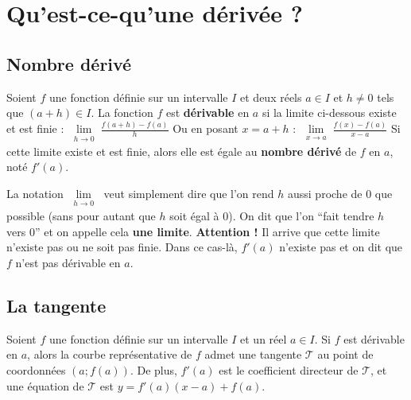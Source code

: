 



	\section{Qu'est-ce-qu'une dérivée ?}
	
	\subsection{Nombre dérivé}
	
	\begin{formula}[Définition]
		Soient $f$ une fonction définie sur un intervalle $I$ et deux réels $a \in I$ et $h \neq 0$ tels que $(a + h) \in I$.
		\newpar
		La fonction $f$ est \textbf{dérivable} en $a$ si la limite ci-dessous existe et est finie :
		\newpar
		$\displaystyle{\lim\limits_{\substack{h \rightarrow 0}} \frac{f(a + h) - f(a)}{h}}$
		\newpar
		Ou en posant $x = a + h$ :
		\newpar
		$\displaystyle{\lim\limits_{\substack{x \rightarrow a}} \frac{f(x) - f(a)}{x-a}}$
		\newpar
		Si cette limite existe et est finie, alors elle est égale au \textbf{nombre dérivé} de $f$ en $a$, noté $f'(a)$.
	\end{formula}
	
	\begin{tip}
		La notation $\displaystyle{\lim\limits_{\substack{h \rightarrow 0}}}$ veut simplement dire que l'on rend $h$ aussi proche de $0$ que possible (sans pour autant que $h$ soit égal à $0$). On dit que l'on ``fait tendre $h$ vers $0$'' et on appelle cela \textbf{une limite}.
		\newpar
		\textbf{Attention !} Il arrive que cette limite n'existe pas ou ne soit pas finie. Dans ce cas-là, $f'(a)$ n'existe pas et on dit que $f$ n'est pas dérivable en $a$.
	\end{tip}
	
	\subsection{La tangente}
	
	\begin{formula}
		Soient $f$ une fonction définie sur un intervalle $I$ et un réel $a \in I$. Si $f$ est dérivable en $a$, alors la courbe représentative de $f$ admet une tangente $\mathcal{T}$ au point de coordonnées $(a; f(a))$.
		\newpar
		De plus, $f'(a)$ est le coefficient directeur de $\mathcal{T}$, et une équation de $\mathcal{T}$ est $y = f'(a)(x-a)+f(a)$.
	\end{formula}
	
